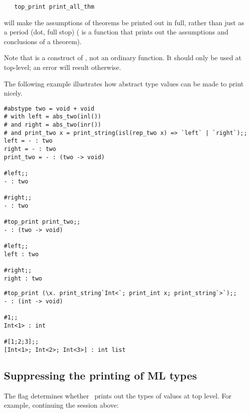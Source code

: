 \begin{hol}\begin{verbatim}
   top_print print_all_thm
\end{verbatim}\end{hol}

\noindent will make the assumptions of theorems be printed out 
in full, rather than
just as a period 
(dot, full stop) ( is a function that prints out the
assumptions and conclusions of a theorem). 

Note that  is a construct of \ML, not an ordinary function. It
should only be used at top-level; an error will result otherwise.

The following example illustrates how
abstract type values can be made to print nicely.

\setcounter{sessioncount}{1}
\begin{session}\begin{verbatim}
#abstype two = void + void
# with left = abs_two(inl())
# and right = abs_two(inr())
# and print_two x = print_string(isl(rep_two x) => `left` | `right`);;
left = - : two
right = - : two
print_two = - : (two -> void)

#left;;
- : two

#right;;
- : two

#top_print print_two;;
- : (two -> void)

#left;;
left : two

#right;;
right : two
\end{verbatim}\end{session}
\vfill
\newpage
\begin{session}\begin{verbatim}
#top_print (\x. print_string`Int<`; print_int x; print_string`>`);;
- : (int -> void)

#1;;
Int<1> : int

#[1;2;3];;
[Int<1>; Int<2>; Int<3>] : int list
\end{verbatim}\end{session}

\subsection{Suppressing the printing of ML types}

The flag  determines whether \ML\ prints out the types of
values at top level. For example, continuing the session above:

